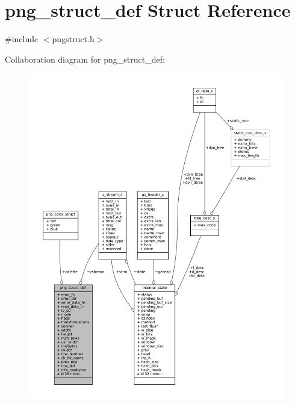 \hypertarget{structpng__struct__def}{}\section{png\+\_\+struct\+\_\+def Struct Reference}
\label{structpng__struct__def}


{\ttfamily \#include $<$pngstruct.\+h$>$}



Collaboration diagram for png\+\_\+struct\+\_\+def\+:
\nopagebreak
\begin{figure}[H]
\begin{center}
\leavevmode
\includegraphics[width=350pt]{structpng__struct__def__coll__graph}
\end{center}
\end{figure}
